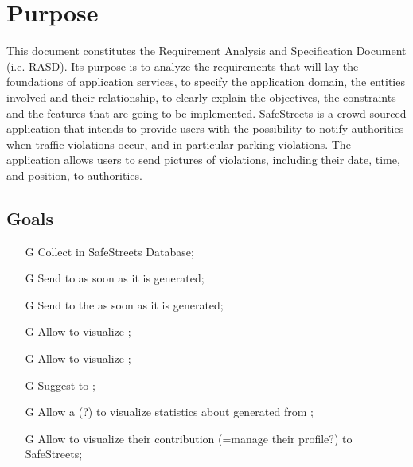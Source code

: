 \documentclass[../../rasd.tex]{subfiles}
\begin{document}
\section{Purpose\label{sect:1.1}}

This document constitutes the Requirement Analysis and Specification Document (i.e. RASD). Its purpose is to analyze the requirements that will lay the foundations of application services, to specify the application domain, the entities involved and their relationship, to clearly explain the objectives, the constraints and the features that are going to be implemented. \newline
SafeStreets is a crowd-sourced application that intends to provide users with the possibility to notify authorities when traffic violations occur, and in particular parking violations. The application allows users to send pictures of violations, including their date, time, and position, to authorities.
			
			\subsection{Goals\label{sect:1.1.1}}
			\begin{itemize}
				\item[G\subs{1}]Collect  in SafeStreets Database;
		\item[G\subs{2}]Send  to  as soon as it is generated;
		\item[G\subs{3}]Send  to the  as soon as it is generated;
		\item[G\subs{4}]Allow  to visualize ;
		\item[G\subs{5}]Allow  to visualize ;
		\item[G\subs{6}]Suggest  to ;
		\item[G\subs{7}]Allow a  (?) to visualize statistics about  generated from ;
		\item[G\subs{8}]Allow  to visualize their contribution (=manage their profile?) to SafeStreets;
			\end{itemize}
\end{document}
